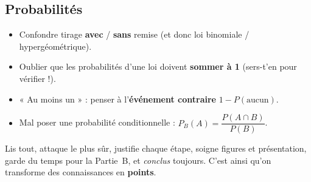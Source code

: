 \subsection{Probabilités}
\begin{itemize}
\item Confondre tirage \textbf{avec} / \textbf{sans} remise (et donc loi binomiale / hypergéométrique).
\item Oublier que les probabilités d'une loi doivent \textbf{sommer à 1} (sers-t'en pour vérifier !).
\item « Au moins un » : penser à l'\textbf{événement contraire} $1-P(\text{aucun})$.
\item Mal poser une probabilité conditionnelle : $P_B(A)=\dfrac{P(A\cap B)}{P(B)}$.
\end{itemize}

\begin{synthese}
Lis tout, attaque le plus sûr, justifie chaque étape, soigne figures et présentation,
garde du temps pour la Partie~B, et \emph{conclus} toujours. C'est ainsi qu'on transforme
des connaissances en \textbf{points}.
\end{synthese}
